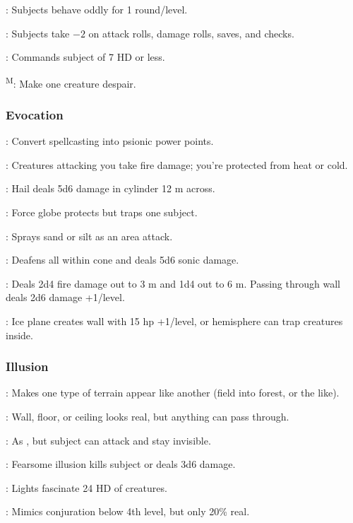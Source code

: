 	: Subjects behave oddly for 1 round/level.

	: Subjects take $-2$ on attack rolls, damage rolls, saves, and checks.

	: Commands subject of 7 HD or less.

	\textsuperscript{M}: Make one creature despair.

\subsubsection{Evocation}
	: Convert spellcasting into psionic power points.

	: Creatures attacking you take fire damage; you're protected from heat or cold.

	: Hail deals 5d6 damage in cylinder 12 m across.

	: Force globe protects but traps one subject.

	: Sprays sand or silt as an area attack. %

	: Deafens all within cone and deals 5d6 sonic damage.

	: Deals 2d4 fire damage out to 3 m and 1d4 out to 6 m. Passing through wall deals 2d6 damage +1/level.

	: Ice plane creates wall with 15 hp +1/level, or hemisphere can trap creatures inside.

\subsubsection{Illusion}
	: Makes one type of terrain appear like another (field into forest, or the like).

	: Wall, floor, or ceiling looks real, but anything can pass through.

	: As , but subject can attack and stay invisible.

	: Fearsome illusion kills subject or deals 3d6 damage.

	: Lights fascinate 24 HD of creatures.

	: Mimics conjuration below 4th level, but only 20\% real.

